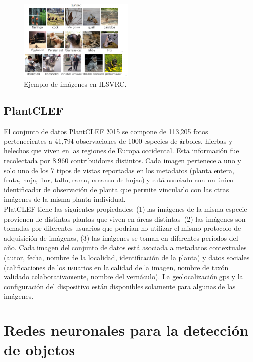 \documentclass{bmvc2k}
\begin{document}
\begin{figure}
\begin{center}
	\includegraphics[width=0.5\textwidth]{images/ILSVRC.png}
   \caption{Ejemplo de imágenes en ILSVRC.}
	\label{fig.ilsvrc}
\end{center}
\end{figure}


\subsection{PlantCLEF}

El conjunto de datos PlantCLEF 2015 se compone de 113,205 fotos pertenecientes a 41,794 observaciones de 1000 especies de árboles, hierbas y helechos que viven en las regiones de Europa occidental. Esta información fue recolectada por 8.960 contribuidores distintos. Cada imagen pertenece a uno y solo uno de los 7 tipos de vistas reportadas en los metadatos (planta entera, fruta, hoja, flor, tallo, rama, escaneo de hojas) y está asociado con un único identificador de observación de planta que permite vincularlo con las otras imágenes de la misma planta individual.\\

PlatCLEF tiene las siguientes propiedades: (1) las imágenes de la misma especie provienen de distintas plantas que viven en áreas distintas, (2) las imágenes son tomadas por diferentes usuarios que podrían no utilizar el mismo protocolo de adquisición de imágenes, (3) las imágenes se toman en diferentes períodos del año. Cada imagen del conjunto de datos está asociada a metadatos contextuales (autor, fecha, nombre de la localidad, identificación de la planta) y datos sociales (calificaciones de los usuarios en la calidad de la imagen, nombre de taxón validado colaborativamente, nombre del vernáculo). La geolocalización gps y la configuración del dispositivo están disponibles solamente para algunas de las imágenes. \\


\section{Redes neuronales para la detección de objetos}
\end{document}
